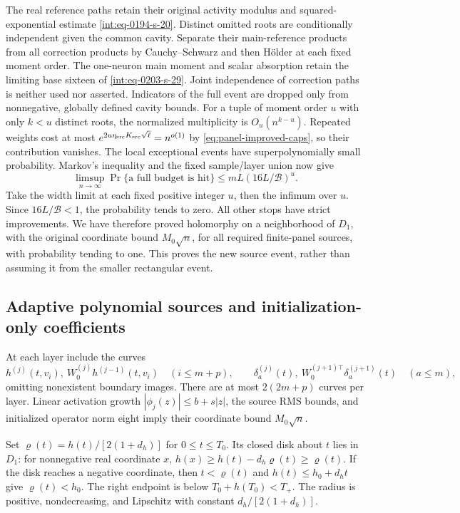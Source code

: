 The real reference paths retain their original activity modulus and
squared-exponential estimate \eqref{int:eq-0194-s-20}.  Distinct omitted
roots are conditionally independent given the common cavity.  Separate
their main-reference products from all correction products by
Cauchy--Schwarz and then H\"older at each fixed moment order.  The
one-neuron main moment and scalar absorption retain the limiting base
sixteen of \eqref{int:eq-0203-s-29}.  Joint independence of correction
paths is neither used nor asserted.  Indicators of the full event are
dropped only from nonnegative, globally defined cavity bounds.
For a tuple of moment order \(u\) with only \(k<u\) distinct roots,
the normalized multiplicity is \(O_u(n^{k-u})\).  Repeated weights
cost at most \(e^{2u\eta_{\rm src}K_{\rm src}\sqrt\ell}=n^{o(1)}\)
by \eqref{eq:panel-improved-caps}, so their contribution vanishes.
The local exceptional events have superpolynomially small probability.
Markov's inequality and the fixed sample/layer union now give
\[
 \limsup_{n\to\infty}\Pr\{\text{a full budget is hit}\}
 \le mL(16L/\mathcal B)^u.
\]
Take the width limit at each fixed positive integer \(u\), then the
infimum over \(u\).  Since \(16L/\mathcal B<1\), the probability
tends to zero.  All other stops have strict improvements.  We have
therefore proved holomorphy on a neighborhood of \(D_1\), with the
original coordinate bound \(M_0\sqrt n\), for all required finite-panel
sources, with probability tending to one.  This proves the new source
event, rather than assuming it from the smaller rectangular event.

\subsection{Adaptive polynomial sources and initialization-only coefficients}
\label{sec:panel-compiler}

At each layer include the curves
\[
 h^{(j)}(t,v_i),\ W_0^{(j)}h^{(j-1)}(t,v_i)\quad(i\le m+p),
 \qquad
 \delta_a^{(j)}(t),\ W_0^{(j+1)\top}\delta_a^{(j+1)}(t)
       \quad(a\le m),
\]
omitting nonexistent boundary images.  There are at most \(2(2m+p)\)
curves per layer.  Linear activation growth
\(|\phi_j(z)|\le b+s|z|\), the source RMS bounds, and initialized
operator norm eight imply their coordinate bound \(M_0\sqrt n\).

Set \(\varrho(t)=h(t)/[2(1+d_h)]\) for \(0\le t\le T_0\).
Its closed disk about \(t\) lies in \(D_1\): for nonnegative real
coordinate \(x\), \(h(x)\ge h(t)-d_h\varrho(t)\ge\varrho(t)\).
If the disk reaches a negative coordinate, then \(t<\varrho(t)\)
and \(h(t)\le h_0+d_ht\) give \(\varrho(t)<h_0\).
The right endpoint is below \(T_0+h(T_0)<T_+\).
The radius is positive, nondecreasing, and Lipschitz with constant
\(d_h/[2(1+d_h)]\).

